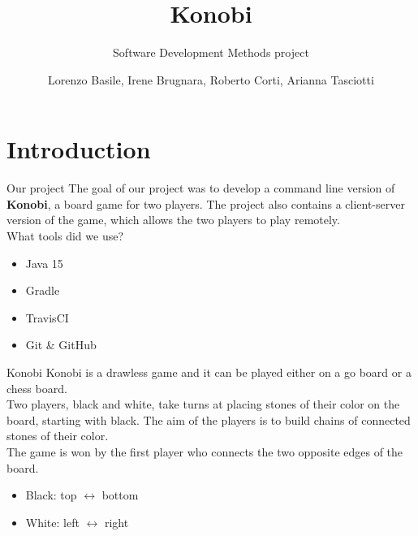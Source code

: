 \documentclass{beamer}
\title{\huge Konobi}
\date{}
\subtitle{Software Development Methods project}
\author{Lorenzo Basile, Irene Brugnara, Roberto Corti, Arianna Tasciotti}
\begin{document}
	
  \maketitle
  \section{Introduction}
  
  \begin{frame}{Our project}
    The goal of our project was to develop a command line version of \textbf{Konobi}, a board game for two players. The project also contains a client-server version of the game, which allows the two players to play remotely.
    \vspace{0.7cm}
    \pause
    \\What tools did we use?
    \begin{itemize}
	    \item Java 15
	    \item Gradle
	    \item TravisCI
	    \item Git \& GitHub
    \end{itemize}

  \end{frame}
  
  \begin{frame}{Konobi}
	    Konobi is a drawless game and it can be played either on a go board or a chess board.
	    \\Two players, black and white, take turns at placing stones of their color on the board, starting with black. The aim of the players is to build chains of connected stones of their color.
	    \vspace{0.5cm}
	    \pause
	    \\The game is won by the first player who connects the two opposite edges of the board.
	    \begin{itemize}
	    \item Black: top $\leftrightarrow$ bottom
	    \item White: left $\leftrightarrow$ right
	    \end{itemize}
   \end{frame}
      
\end{document}
